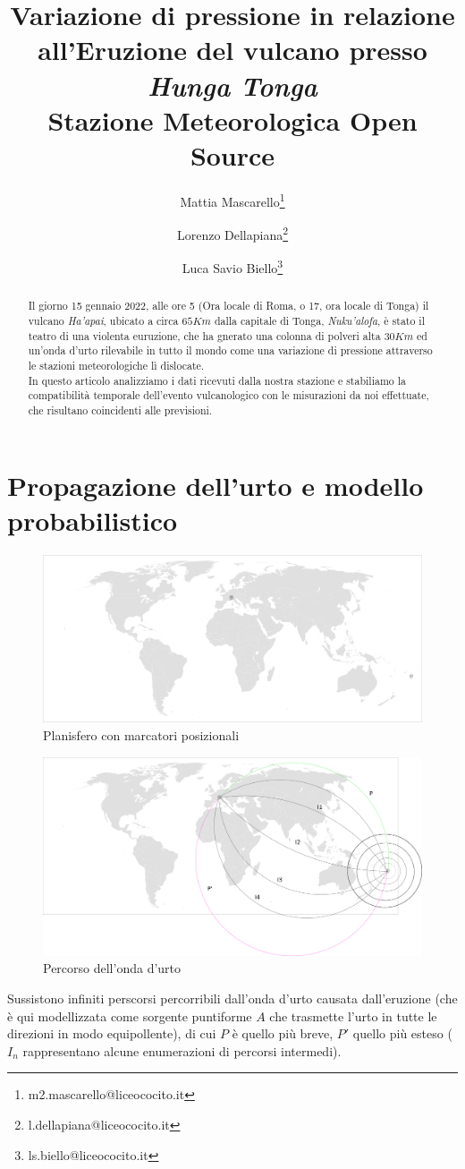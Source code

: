 \documentclass[12pt, a4paper]{article}
\title{Variazione di pressione in relazione all'Eruzione del vulcano presso  \emph{Hunga Tonga}\\ \Large{Stazione Meteorologica Open Source}}
\author{Mattia Mascarello\thanks{m2.mascarello@liceococito.it}\and Lorenzo Dellapiana\thanks{l.dellapiana@liceococito.it}\and Luca Savio Biello\thanks{ls.biello@liceococito.it}}
\date{\parbox{\linewidth}{\centering%
		\today\endgraf\bigskip
		Liceo Scientifico Statale ``Leonardo Cocito''}}
\begin{document}
	
	\maketitle
	
	\begin{abstract}
		Il giorno 15 gennaio 2022, alle ore 5 (Ora locale di Roma, o 17, ora locale di Tonga) il vulcano \emph{Ha’apai}, ubicato a circa $65Km$ dalla capitale di Tonga, \emph{Nuku’alofa}, è stato il teatro di una violenta euruzione, che ha gnerato una colonna di polveri alta $30 Km$ ed un'onda d'urto rilevabile in tutto il mondo come una variazione di pressione attraverso le stazioni meteorologiche lì dislocate.\\
		In questo articolo analizziamo i dati ricevuti dalla nostra stazione e stabiliamo la compatibilità temporale dell'evento vulcanologico con le misurazioni da noi effettuate, che risultano coincidenti alle previsioni.
	\end{abstract}
	\pagebreak
	\tableofcontents
	\pagebreak
\section{Propagazione dell'urto e modello probabilistico}
	
\begin{figure}[H]
	\centering
	\includegraphics[width=\textwidth]{wmab.png}
	\caption{Planisfero con marcatori posizionali}
\end{figure}
\begin{figure}[H]
	\centering
	\includegraphics[width=1.08\textwidth]{wmi.png}
	\caption{Percorso dell'onda d'urto}
\end{figure}
Sussistono infiniti perscorsi percorribili dall'onda d'urto causata dall'eruzione (che è qui modellizzata come sorgente puntiforme $A$ che trasmette l'urto in tutte le direzioni in modo equipollente), di cui $P$ è quello più breve, $P'$ quello più esteso ($I_n$ rappresentano alcune enumerazioni di percorsi intermedi).
\end{document}
